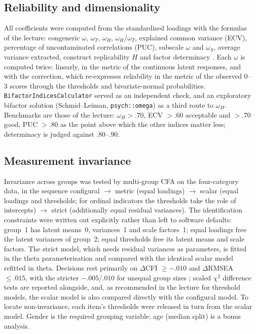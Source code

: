 \documentclass[11pt,a4paper]{article}
\begin{document}
\subsection{Reliability and dimensionality}\label{sec:methods_rel}

All coefficients were computed from the standardised loadings with the formulas of the
lecture: congeneric $\omega$, $\omega_T$, $\omega_H$, $\omega_H/\omega_T$, explained
common variance (ECV), percentage of uncontaminated correlations (PUC), subscale
$\omega$ and $\omega_S$, average variance extracted,
construct replicability $H$ and factor determinacy
\citep{rodriguez2016evaluating}. Each $\omega$
is computed twice: linearly, in the metric of the continuous latent responses, and with
the \citet{green2009reliability} correction, which re-expresses reliability in the metric
of the observed 0--3 scores through the thresholds and bivariate-normal probabilities.
\texttt{BifactorIndicesCalculator} served as an independent
check, and an exploratory bifactor solution (Schmid--Leiman, \texttt{psych::omega}) as a third route to $\omega_H$. Benchmarks are those of the
lecture: $\omega_H>.70$, ECV $>.60$ acceptable and $>.70$ good, PUC $>.80$ as the point
above which the other indices matter less; determinacy is judged against $.80$--$.90$.

\subsection{Measurement invariance}\label{sec:methods_mi}

Invariance across groups was tested by multi-group CFA on the four-category data, in the sequence
configural $\rightarrow$ metric (equal loadings) $\rightarrow$ scalar (equal loadings and
thresholds; for ordinal indicators the thresholds take the role of intercepts)
$\rightarrow$ strict (additionally equal residual variances). The identification
constraints were written out explicitly rather than left to software defaults: group~1
has latent means~0, variances~1 and scale factors~1; equal loadings free the latent
variances of group~2; equal thresholds free its latent means and scale factors. The
strict model, which needs residual variances as parameters, is fitted in the theta
parameterisation and compared with the identical scalar model refitted in theta.
Decisions rest primarily on $\Delta$CFI $\ge-.010$ and $\Delta$RMSEA $\le.015$, with
the stricter $-.005$/$.010$ for unequal group sizes \citep{chen2007sensitivity}; scaled
$\chi^2$ difference tests are reported alongside, and, as recommended in the lecture
for threshold models, the scalar model is also compared directly with the configural
model. To locate non-invariance, each
item's thresholds were released in turn from the scalar model. Gender is the required
grouping variable; age (median split) is a bonus analysis.
\end{document}
